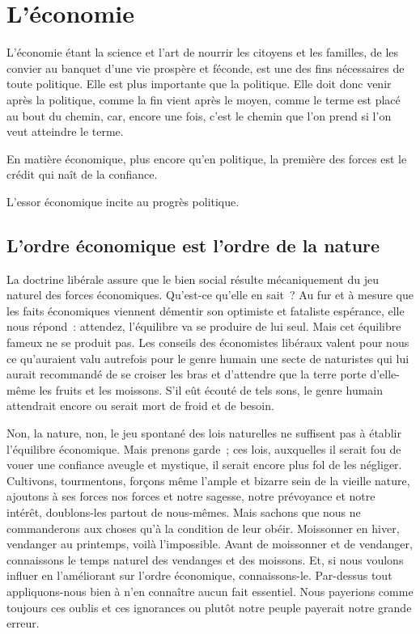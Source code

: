 \documentclass[french,twoside]{book} %
\newcommand{\astermono}{\medskip\centerline{\color{rubric}\large\selectfont{\syms ✻}}\medskip\par}%
\newcommand\chaptercont{} %
\begin{document}
\chaptercont
\section[{L’économie}]{L’économie}
\noindent L’économie étant la science et l’art de nourrir les citoyens et les familles, de les convier au banquet d’une vie prospère et féconde, est une des fins nécessaires de toute politique. Elle est plus importante que la politique. Elle doit donc venir après la politique, comme la fin vient après le moyen, comme le terme est placé au bout du chemin, car, encore une fois, c’est le chemin que l’on prend si l’on veut atteindre le terme.\par

\astermono

\noindent En matière économique, plus encore qu’en politique, la première des forces est le crédit qui naît de la confiance.\par

\astermono

\noindent L’essor économique incite au progrès politique.\par

\astermono

\subsection[{L’ordre économique est l’ordre de la nature}]{L’ordre économique est l’ordre de la nature}
\noindent La doctrine libérale assure que le bien social résulte mécaniquement du jeu naturel des forces économiques. Qu’est-ce qu’elle en sait ? Au fur et à mesure que les faits économiques viennent démentir son optimiste et fataliste espérance, elle nous répond : attendez, l’équilibre va se produire de lui seul. Mais cet équilibre fameux ne se produit pas. Les conseils des économistes libéraux valent pour nous ce qu’auraient valu autrefois pour le genre humain une secte de naturistes qui lui aurait recommandé de se croiser les bras et d’attendre que la terre porte d’elle-même les fruits et les moissons. S’il eût écouté de tels sons, le genre humain attendrait encore ou serait mort de froid et de besoin.\par
Non, la nature, non, le jeu spontané des lois naturelles ne suffisent pas à établir l’équilibre économique. Mais prenons garde ; ces lois, auxquelles il serait fou de vouer une confiance aveugle et mystique, il serait encore plus fol de les négliger. Cultivons, tourmentons, forçons même l’ample et bizarre sein de la vieille nature, ajoutons à ses forces nos forces et notre sagesse, notre prévoyance et notre intérêt, doublons-les partout de nous-mêmes. Mais sachons que nous ne commanderons aux choses qu’à la condition de leur obéir. Moissonner en hiver, vendanger au printemps, voilà l’impossible. Avant de moissonner et de vendanger, connaissons le temps naturel des vendanges et des moissons. Et, si nous voulons influer en l’améliorant sur l’ordre économique, connaissons-le. Par-dessus tout appliquons-nous bien à n’en connaître aucun fait essentiel. Nous payerions comme toujours ces oublis et ces ignorances ou plutôt notre peuple payerait notre grande erreur.\par
\end{document}
